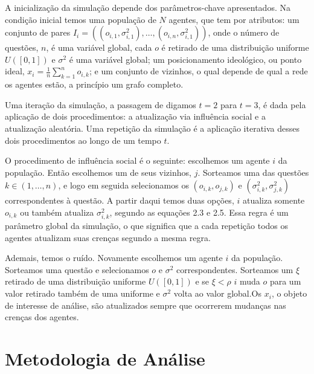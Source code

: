 A inicialização da simulação depende dos parâmetros-chave apresentados. Na
condição inicial temos uma população de \(N\) agentes, que tem por atributos: um
conjunto de pares \(I_i = ((o_{i,1},\sigma_{i,1}^2), \ldots, (o_{i,n},\sigma_{i,1}^2))\), onde
o número de questões, \(n\), é uma variável global, cada \(o\) é retirado de uma
distribuição uniforme \(U([0,1])\) e \(\sigma^2\) é uma variável global; um posicionamento
ideológico, ou ponto ideal, \(x_i = \frac{1}{n} \sum_{k = 1}^n o_{i,k} \); e um
conjunto de vizinhos, o qual depende de qual a rede os agentes estão, a
princípio um grafo completo.

 Uma iteração da simulação, a
passagem de digamos \(t=2\) para \(t=3\), é dada pela aplicação de dois
procedimentos: a atualização via influência social e a atualização aleatória.
Uma repetição da simulação é a aplicação iterativa desses dois procedimentos ao
longo de um tempo \(t \).

O procedimento de influência social é o seguinte: escolhemos um agente \(i\)
da população. Então escolhemos um de seus vizinhos, \(j\). Sorteamos uma das
questões \(k \in (1,\ldots,n)\), e logo em seguida selecionamos os \((o_{i,k},o_{j,k})\) e
\((\sigma_{i,k}^2,\sigma_{j,k}^2)\) correspondentes à questão. A partir daqui temos duas
opções, \(i\) atualiza somente \(o_{i,k}\) ou também atualiza \(\sigma_{i,k}^2\),
segundo as equações 2.3 e 2.5. Essa regra é um parâmetro global da simulação,
o que significa que a cada repetição todos os agentes atualizam suas crenças
segundo a mesma regra.

Ademais, temos o ruído. Novamente escolhemos um agente \(i\) da população.
Sorteamos uma questão e selecionamos \(o\) e \(\sigma^2\) correspondentes. Sorteamos
um \(\xi\) retirado de uma distribuição uniforme \(U([0,1])\) e se \(\xi < \rho\) \(i\)
muda \(o\) para um valor retirado também de uma uniforme e \(\sigma^2\) volta ao
valor global.Os \(x_i\), o objeto de interesse de análise, são atualizados
sempre que ocorrerem mudanças nas crenças dos agentes.



\section{Metodologia de Análise}
























